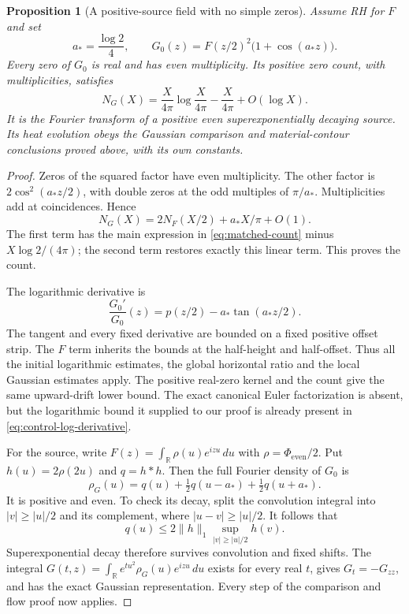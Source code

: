 \documentclass[11pt]{article}
\newcommand{\R}{\mathbb R}
\newcommand{\dd}{\,d}
\newtheorem{proposition}[theorem]{Proposition}
\theoremstyle{remark}
\begin{document}
\begin{proposition}[A positive-source field with no simple zeros]
\label{prop:all-multiple}
Assume RH for $F$ and set
\begin{equation}
 a_* =\frac{\log2}{4},\qquad
 G_0(z)=F(z/2)^2\bigl(1+\cos(a_*z)\bigr).
 \label{eq:all-multiple-control}
\end{equation}
Every zero of $G_0$ is real and has even multiplicity. Its positive zero
count, with multiplicities, satisfies
\begin{equation}
 N_G(X)=\frac X{4\pi}\log\frac X{4\pi}-\frac X{4\pi}
             +O(\log X).
 \label{eq:matched-count}
\end{equation}
It is the Fourier transform of a positive even superexponentially
decaying source. Its heat evolution obeys the Gaussian comparison and
material-contour conclusions proved above, with its own constants.
\end{proposition}
\begin{proof}
Zeros of the squared factor have even multiplicity. The other factor
is $2\cos^2(a_*z/2)$, with double zeros at the odd multiples of
$\pi/a_*$. Multiplicities add at coincidences. Hence
\[
 N_G(X)=2N_F(X/2)+a_*X/\pi+O(1).
\]
The first term has the main expression in \eqref{eq:matched-count}
minus $X\log2/(4\pi)$; the second term restores exactly this linear
term. This proves the count.

The logarithmic derivative is
\begin{equation}
 \frac{G_0'}{G_0}(z)=p(z/2)-a_*\tan(a_*z/2).
 \label{eq:control-log-derivative}
\end{equation}
The tangent and every fixed derivative are bounded on a fixed positive
offset strip. The $F$ term inherits the bounds at the half-height and
half-offset. Thus all the initial logarithmic estimates, the global
horizontal ratio and the local Gaussian estimates apply. The positive
real-zero kernel and the count give the same upward-drift lower bound.
The exact canonical Euler factorization is absent, but the logarithmic
bound it supplied to our proof is already present in
\eqref{eq:control-log-derivative}.

For the source, write
$F(z)=\int_\R\rho(u)e^{izu}\dd u$ with
$\rho=\Phi_{\mathrm{even}}/2$. Put $h(u)=2\rho(2u)$ and $q=h*h$.
Then the full Fourier density of $G_0$ is
\begin{equation}
 \rho_G(u)=q(u)+\tfrac12q(u-a_*)+\tfrac12q(u+a_*).
 \label{eq:control-source}
\end{equation}
It is positive and even. To check its decay, split the convolution
integral into $|v|\ge|u|/2$ and its complement, where
$|u-v|\ge|u|/2$. It follows that
\[
 q(u)\le2\|h\|_1\sup_{|v|\ge|u|/2}h(v).
\]
Superexponential decay therefore survives convolution and fixed shifts.
The integral
$G(t,z)=\int_\R e^{tu^2}\rho_G(u)e^{izu}\dd u$
exists for every real $t$, gives $G_t=-G_{zz}$, and has the exact
Gaussian representation. Every step of the comparison and flow proof
now applies.
\end{proof}
\end{document}
